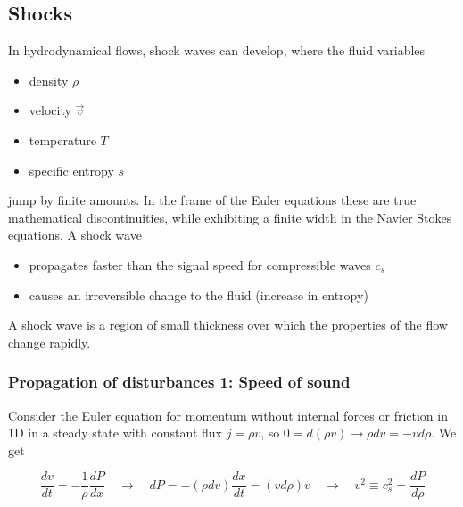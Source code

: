 \subsection{Shocks}
In hydrodynamical flows, shock waves can develop, where the fluid variables
\begin{itemize}
    \item density $\rho$
    \item velocity $\vec{v}$
    \item temperature $T$
    \item specific entropy $s$
\end{itemize}
jump by finite amounts. In the frame of the Euler equations these are
true mathematical discontinuities, while exhibiting a finite width in the Navier Stokes equations. A shock wave
\begin{itemize}
    \item propagates faster than the signal speed for compressible waves $c_s$
    \item causes an irreversible change to the fluid (increase in entropy)
\end{itemize}
A shock wave is a region of small thickness over which the properties of the flow change rapidly.

\subsubsection{Propagation of disturbances 1: Speed of sound}
Consider the Euler equation for momentum without internal forces
or friction in 1D in a steady state with constant flux $j = \rho v$, so
$0 = d(\rho v) \rightarrow \rho dv = -v d\rho$. We get

\begin{equation}
    \frac{dv}{dt} = -\frac{1}{\rho} \frac{dP}{dx} \quad \rightarrow \quad dP = -(\rho dv) \frac{dx}{dt} = (v d\rho) v \quad \rightarrow \quad v^2 \equiv c_s^2 = \frac{dP}{d\rho}
\end{equation}

